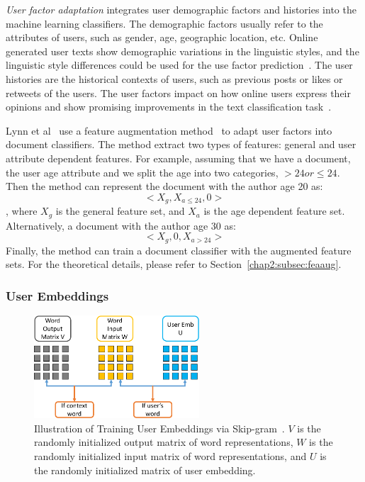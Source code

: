 \textit{User factor adaptation} integrates user demographic factors and histories into the machine learning classifiers. The demographic factors usually refer to the attributes of users, such as gender, age, geographic location, etc. Online generated user texts show demographic variations in the linguistic styles, and the linguistic style differences could be used for the use factor prediction~\cite{rosenthal2011age, zhang2016predicting, hovy2018improving}. The user histories are the historical contexts of users, such as previous posts or likes or retweets of the users. The user factors impact on how online users express their opinions and show promising improvements in the text classification task~\cite{volkova2013exploring, hovy2015demographic, lynn2017human, yang2017overcoming}.

Lynn et al~\cite{lynn2017human} use a feature augmentation method~\cite{daume2007frustratingly} to adapt user factors into document classifiers.
The method extract two types of features: general and user attribute dependent features. 
For example, assuming that we have a document, the user age attribute and we split the age into two categories, $>24 or \leq 24$.
Then the method can represent the document with the author age 20 as:
$$<X_g, X_{a\leq24}, 0>$$
, where $X_g$ is the general feature set, and $X_a$ is the age dependent feature set.
Alternatively, a document with the author age 30 as:
$$<X_g, 0, X_{a>24}>$$
Finally, the method can train a document classifier with the augmented feature sets.
For the theoretical details, please refer to Section~\ref{chap2:subsec:feaaug}.

\subsubsection{User Embeddings}

\begin{figure}[tb!]
\centering
\includegraphics[width=0.55\textwidth]{images/chapter2/user-emb.pdf}
\caption{Illustration of Training User Embeddings via Skip-gram~\cite{amir2017quantifying}. $V$ is the randomly initialized output matrix of word representations, $W$ is the randomly initialized input matrix of word representations, and $U$ is the randomly initialized matrix of user embedding.}
\label{chap2:fig:user}
\end{figure}


